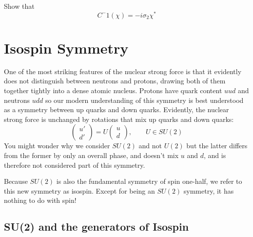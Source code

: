 \documentclass[12pt]{article}
\begin{document}
\exercise Show that
$$C^-1(\chi) = -i\sigma_2 \chi^*$$


\section{Isospin Symmetry}

One of the most striking features of the nuclear strong force is that
it evidently does not distinguish between neutrons and protons,
drawing both of them together tightly into a dense atomic nucleus.
Protons have quark content $uud$ and neutrons $udd$ so our modern
understanding of this symmetry is best understood as a symmetry
between up quarks and down quarks.  Evidently, the nuclear strong
force is unchanged by rotations that mix up quarks and down quarks:
\begin{equation*}
  \begin{pmatrix} u' \\ d' \end{pmatrix}
  = U
  \begin{pmatrix} u \\ d \end{pmatrix},
  \qquad U \in SU(2)
\end{equation*}
You might wonder why we consider $SU(2)$ and not $U(2)$ but the latter
differs from the former by only an overall phase, and doesn't mix $u$
and $d$, and is therefore not considered part of this symmetry.

Because $SU(2)$ is also the fundamental symmetry of spin one-half, we
refer to this new symmetry as isospin.  Except for being an $SU(2)$
symmetry, it has nothing to do with spin!

\subsection*{SU(2) and the generators of Isospin}
\end{document}
